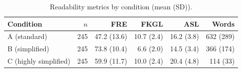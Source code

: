 \begin{table}[H]
\caption{Readability metrics by condition (mean (SD)).}
\label{tab:readability}
\centering
\begin{tabular}{lrrrrr}
\toprule
Condition & $n$ & FRE & FKGL & ASL & Words \\
\midrule
A (standard) & 245 & 47.2 (13.6) & 10.7 (2.4) & 16.2 (3.8) & 632 (289) \\
B (simplified) & 245 & 73.8 (10.4) & 6.6 (2.0) & 14.5 (3.4) & 366 (174) \\
C (highly simplified) & 245 & 59.9 (11.7) & 10.0 (2.4) & 20.4 (4.8) & 114 (33) \\
\bottomrule
\end{tabular}
\end{table}
